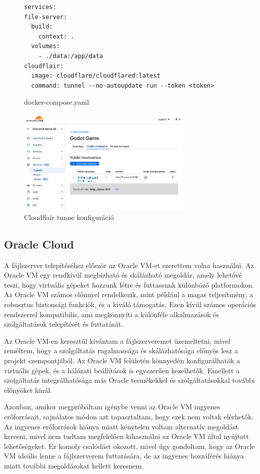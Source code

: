 \begin{figure}[h]
    \centering
\begin{lstlisting}
services:
file-server:
  build:
    context: .
  volumes:
    - ./data:/app/data
cloudflair:
  image: cloudflare/cloudflared:latest 
  command: tunnel --no-autoupdate run --token <token>
\end{lstlisting}
\caption*{docker-compose.yaml}
\label{code:docker-compose}
\end{figure}
\begin{figure}[h]
    \centering
    \includegraphics[width=0.75\textwidth]{img/cloudflair-censored.jpg}
    \caption{Cloudflair tunne konfiguráció}
    \label{img:cloudflair-config}  
\end{figure}


\subsection{Oracle Cloud}
A fájlszerver telepítéséhez először az Oracle VM-et szerettem volna használni. Az Oracle VM egy rendkívül megbízható és skálázható megoldás, amely lehetővé teszi, hogy virtuális gépeket hozzunk létre és futtassunk különböző platformokon. Az Oracle VM számos előnnyel rendelkezik, mint például a magas teljesítmény, a robusztus biztonsági funkciók, és a kiváló támogatás. Ezen kívül számos operációs rendszerrel kompatibilis, ami megkönnyíti a különféle alkalmazások és szolgáltatások telepítését és futtatását.

Az Oracle VM-en keresztül kívántam a fájlszerveremet üzemeltetni, mivel reméltem, hogy a szolgáltatás rugalmassága és skálázhatósága előnyös lesz a projekt szempontjából. Az Oracle VM felületén könnyedén konfigurálhatók a virtuális gépek, és a hálózati beállítások is egyszerűen kezelhetők. Emellett a szolgáltatás integrálhatósága más Oracle termékekkel és szolgáltatásokkal további előnyöket kínál.

Azonban, amikor megpróbáltam igénybe venni az Oracle VM ingyenes erőforrásait, sajnálatos módon azt tapasztaltam, hogy ezek nem voltak elérhetők. Az ingyenes erőforrások hiánya miatt kénytelen voltam alternatív megoldást keresni, mivel nem tudtam megfelelően kihasználni az Oracle VM által nyújtott lehetőségeket. Ez komoly csalódást okozott, mivel úgy gondoltam, hogy az Oracle VM ideális lenne a fájlszerverem futtatására, de az ingyenes hozzáférés hiánya miatt további megoldásokat kellett keresnem.


